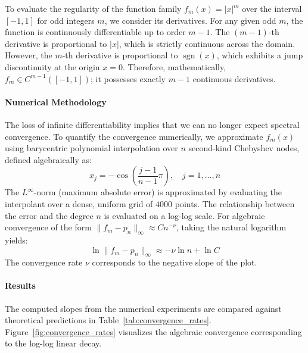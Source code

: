 \begin{solution}

	To evaluate the regularity of the function family $f_m(x) = |x|^m$ over the
	interval $[-1, 1]$ for odd integers $m$, we consider its derivatives. For any
	given odd $m$, the function is continuously differentiable up to order $m-1$.
	The $(m-1)$-th derivative is proportional to $|x|$, which is strictly continuous
	across the domain. However, the $m$-th derivative is proportional to
	$\operatorname{sgn}(x)$, which exhibits a jump discontinuity at the origin
	$x=0$. Therefore, mathematically, $f_m \in C^{m-1}([-1,1])$; it possesses
	exactly $m-1$ continuous derivatives.

	\paragraph{Numerical Methodology}
	The loss of infinite differentiability implies that we can no longer expect
	spectral convergence. To quantify the convergence numerically, we approximate
	$f_m(x)$ using barycentric polynomial interpolation over $n$ second-kind
	Chebyshev nodes, defined algebraically as:
	\[
		x_j = -\cos\left(\frac{j-1}{n-1}\pi\right), \quad j=1,\dots,n
	\]
	The $L^\infty$-norm (maximum absolute error) is approximated by evaluating the
	interpolant over a dense, uniform grid of $4000$ points. The relationship
	between the error and the degree $n$ is evaluated on a log-log scale. For
	algebraic convergence of the form $\|f_m - p_n\|_\infty \approx C n^{-\nu}$,
	taking the natural logarithm yields:
	\[
		\ln \|f_m - p_n\|_\infty \approx -\nu \ln n + \ln C
	\]
	The convergence rate $\nu$ corresponds to the negative slope of the plot.

	\paragraph{Results}
	The computed slopes from the numerical experiments are compared against
	theoretical predictions in Table~\ref{tab:convergence_rates}.
	Figure~\ref{fig:convergence_rates} visualizes the algebraic convergence
	corresponding to the log-log linear decay.


\end{solution}
